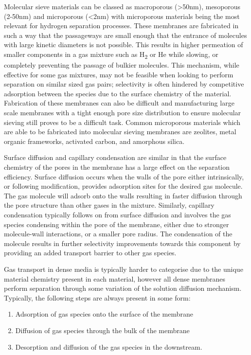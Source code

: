 Molecular sieve materials can be classed as macroporous (>50nm), mesoporous (2-50nm) and microporous (<2nm) 
with microporous materials being the most relevant for hydrogen separation processes. These membranes are 
fabricated in such a way that the passageways are small enough that the entrance of molecules with large 
kinetic diameters is not possible. This results in higher permeation of smaller components in a gas mixture 
such as H\textsubscript{2} or He while slowing, or completely preventing the passage of bulkier molecules. This mechanism, 
while effective for some gas mixtures, may not be feasible when looking to perform separation on similar 
sized gas pairs; selectivity is often hindered by competitive adsorption between the species due to the 
surface chemistry of the material. Fabrication of these membranes can also be difficult and manufacturing 
large scale membranes with a tight enough pore size distribution to ensure molecular sieving still proves 
to be a difficult task. Common microporous materials which are able to be fabricated into molecular sieving 
membranes are zeolites, metal organic frameworks, activated carbon, and amorphous silica.

Surface diffusion and capillary condensation are similar in that the surface chemistry of the pores in the 
membrane has a large effect on the separation efficiency. Surface diffusion occurs when the walls of the pore 
either intrinsically, or following modification, provides adsorption sites for the desired gas molecule. 
The gas molecule will adsorb onto the walls resulting in faster diffusion through the pore structure than 
other gases in the mixture. Similarly, capillary condensation typically follows on from surface diffusion 
and involves the gas species condensing within the pore of the membrane, either due to stronger molecule-wall 
interactions, or a smaller pore radius. The condensation of the molecule results in further selectivity 
improvements towards this component by providing an added transport barrier to other gas species. 

Gas transport in dense media is typically harder to categorise due to the unique material chemistry present 
in each material, however all dense membranes perform separation through some variation of the solution 
diffusion mechanism. Typically, the following steps are always present in some form:
\begin{enumerate}
\item Adsorption of gas species onto the surface of the membrane 
\item Diffusion of gas species through the bulk of the membrane 
\item Desorption and diffusion of the gas species in the downstream. 
\end{enumerate}

